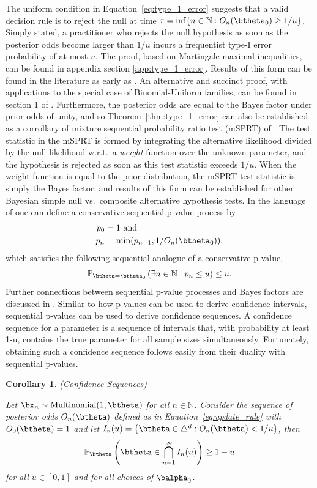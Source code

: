 \documentclass[11pt]{article}
\newtheorem{cor}{Corollary}[section]
\begin{document}
The uniform condition in Equation~\ref{eq:type_1_error} suggests that a valid decision rule is to reject the null at time $\tau = \inf \lbrace n \in \mathbb{N}: O_n(\btheta_0) \geq 1/u \rbrace$.
Simply stated, a practitioner who rejects the null hypothesis as soon as the posterior odds become larger than $1/u$ incurs a frequentist type-I error probability of at most $u$.
The proof, based on Martingale maximal inequalities, can be found in appendix section \ref{app:type_1_error}.
Results of this form can be found in the literature as early as \cite{ville}.
An alternative and succinct proof, with applications to the special case of Binomial-Uniform families, can be found in section 1 of \cite{robbins}.
Furthermore, the posterior odds are equal to the Bayes factor under prior odds of unity, and so Theorem~\ref{thm:type_1_error} can also be established as a corrollary of mixture sequential probability ratio test (mSPRT) of \cite{wald}.
The test statistic in the mSPRT is formed by integrating the alternative likelihood divided by the null likelihood w.r.t.\ a \textit{weight} function over the unknown parameter, and the hypothesis is rejected as soon as this test statistic exceeds $1/u$.
When the weight function is equal to the prior distribution, the mSPRT test statistic is simply the Bayes factor, and results of this form can be established for other Bayesian simple null vs.\ composite alternative hypothesis tests.
In the language of \cite{johari} one can define a conservative sequential p-value process by
\begin{align*}
  p_0 &=1 \text{ and}\\
  p_n &= \min(p_{n-1}, 1/O_n(\btheta_0)),
\end{align*}
which satisfies the following sequential analogue of a conservative p-value,
\begin{equation}
  \label{eq:conservative_p_value}
  \mathbb{P}_{\btheta = \btheta_0}\left( \exists n \in \mathbb{N}: p_n \leq u \right) \leq u.
\end{equation}
Further connections between sequential p-value processes and Bayes factors are discussed in \cite{shafer}.
Similar to how p-values can be used to derive confidence intervals, sequential p-values can be used to derive confidence sequences.
A confidence sequence for a parameter is a sequence of intervals that, with probability at least 1-u, contains the true parameter for all sample sizes simultaneously.
Fortunately, obtaining such a confidence sequence follows easily from their duality with sequential p-values.
\begin{cor}(Confidence Sequences)
  \label{thm:confidence_sequence}

  \noindent Let $\bx_n\sim \mathrm{Multinomial}(1,\btheta)$ for all $n \in \mathbb{N}$.
Consider the sequence of posterior odds $O_n(\btheta)$ defined as in Equation~\ref{eq:update_rule} with $O_0(\btheta)=1$ and
 let $I_n(u) = \lbrace \btheta \in \triangle^d : O_n(\btheta) < 1/u  \rbrace$, then
\begin{equation}
  \label{eq:confidence_sequence}
  \mathbb{P}_{\btheta}\left( \btheta \in \bigcap_{n=1}^{\infty} I_n(u) \right) \geq 1- u
\end{equation}
for all $u \in [0,1]$ and for all choices of $\balpha_0$.
\end{cor}
\end{document}
